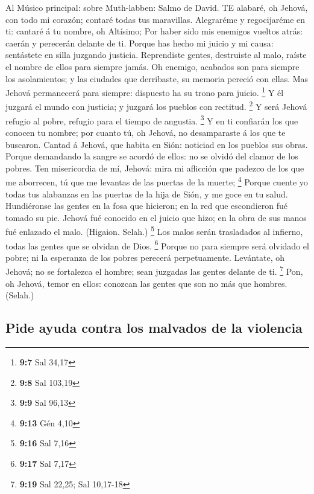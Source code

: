  Al Músico principal: sobre Muth-labben: Salmo de David. TE
alabaré, oh Jehová, con todo mi corazón; contaré todas tus maravillas.
 Alegraréme y regocijaréme en ti: cantaré á tu nombre, oh
Altísimo;  Por haber sido mis enemigos vueltos atrás: caerán
y perecerán delante de ti.  Porque has hecho mi juicio y mi
causa: sentástete en silla juzgando justicia.  Reprendiste
gentes, destruiste al malo, raíste el nombre de ellos para siempre
jamás.  Oh enemigo, acabados son para siempre los
asolamientos; y las ciudades que derribaste, su memoria pereció con
ellas.  Mas Jehová permanecerá para siempre: dispuesto ha su
trono para juicio. \footnote{\textbf{9:7} Sal 34,17}  Y él
juzgará el mundo con justicia; y juzgará los pueblos con rectitud.
\footnote{\textbf{9:8} Sal 103,19}  Y será Jehová refugio al
pobre, refugio para el tiempo de angustia. \footnote{\textbf{9:9} Sal
  96,13}  Y en ti confiarán los que conocen tu nombre; por
cuanto tú, oh Jehová, no desamparaste á los que te buscaron.
 Cantad á Jehová, que habita en Sión: noticiad en los
pueblos sus obras.  Porque demandando la sangre se acordó
de ellos: no se olvidó del clamor de los pobres.  Ten
misericordia de mí, Jehová: mira mi aflicción que padezco de los que me
aborrecen, tú que me levantas de las puertas de la muerte; \footnote{\textbf{9:13}
  Gén 4,10}  Porque cuente yo todas tus alabanzas en las
puertas de la hija de Sión, y me goce en tu salud. 
Hundiéronse las gentes en la fosa que hicieron; en la red que
escondieron fué tomado su pie.  Jehová fué conocido en el
juicio que hizo; en la obra de sus manos fué enlazado el malo. (Higaion.
Selah.) \footnote{\textbf{9:16} Sal 7,16}  Los malos serán
trasladados al infierno, todas las gentes que se olvidan de Dios.
\footnote{\textbf{9:17} Sal 7,17}  Porque no para siempre
será olvidado el pobre; ni la esperanza de los pobres perecerá
perpetuamente.  Levántate, oh Jehová; no se fortalezca el
hombre; sean juzgadas las gentes delante de ti. \footnote{\textbf{9:19}
  Sal 22,25; Sal 10,17-18}  Pon, oh Jehová, temor en ellos:
conozcan las gentes que son no más que hombres. (Selah.)

\hypertarget{pide-ayuda-contra-los-malvados-de-la-violencia}{%
\subsection{Pide ayuda contra los malvados de la
violencia}\label{pide-ayuda-contra-los-malvados-de-la-violencia}}

